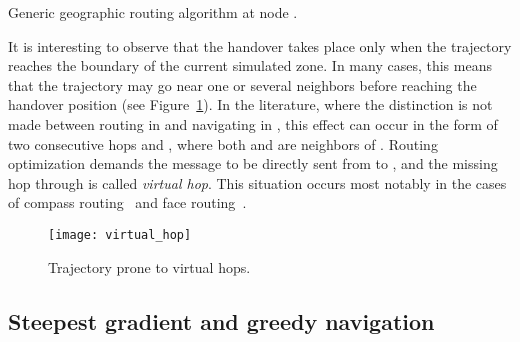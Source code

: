 \documentclass{article}
\begin{document}
\begin{table}[htb]
\begin{center}
\end{center}
\caption{Generic geographic routing algorithm at node .}
\label{tab_routing}
\end{table}

It is interesting to observe that the handover takes place only when the trajectory reaches the boundary of the current simulated zone. In many cases, this means that the trajectory may go near one or several neighbors before reaching the handover position (see Figure~\ref{fig_virtual_hop}). In the literature, where the distinction is not made between routing in  and navigating in , this effect can occur in the form of two consecutive hops  and , where both  and  are neighbors of . Routing optimization demands the message to be directly sent from  to , and the missing hop through  is called {\em virtual hop}. This situation occurs most notably in the cases of compass routing~\cite{bib_compass} and face routing~\cite{bib_face}.

\begin{figure}[htb]
\begin{center}
\texttt{[image: virtual\_hop]}
\caption{Trajectory prone to virtual hops.}
\label{fig_virtual_hop}
\end{center}
\end{figure}

\subsection{Steepest gradient and greedy navigation}
\label{sub_greedy}
\end{document}
